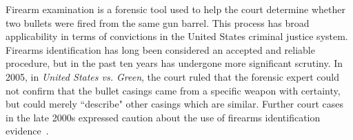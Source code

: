 \documentclass[aoas, preprint]{imsart}\usepackage[]{graphicx}\usepackage[]{color}
\begin{document}
Firearm examination is a forensic tool used to help the court determine whether two bullets were fired from the same gun barrel. This process has broad applicability in terms of convictions in the United States criminal justice system. Firearms identification has long been considered an accepted and reliable procedure, but in the past ten years has undergone more significant scrutiny. In 2005, in \emph{United States vs. Green}, the court ruled that the forensic expert could not confirm that the bullet casings came from a specific weapon with certainty, but could merely ``describe" other casings which are similar. Further court cases in the late 2000s expressed caution about the use of firearms identification evidence~\citep{giannelli:2011}.
\end{document}
